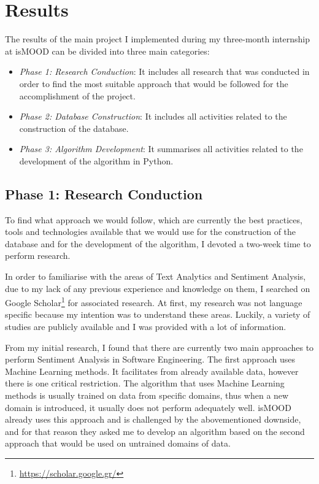 \section{Results}
\label{sec:results}

The results of the main project I implemented
during my three-month internship at isMOOD can be divided
into three main categories:

\begin{itemize}
  \item \emph{Phase 1: Research Conduction}: It includes all research that was conducted
  in order to find the most suitable approach
  that would be followed for the accomplishment of the project. 
  \item \emph{Phase 2: Database Construction}: It includes all activities related to the construction
  of the database.
  \item \emph{Phase 3: Algorithm Development}: It summarises all activities related to the development
  of the algorithm in Python.
\end{itemize}

\subsection{Phase 1: Research Conduction}
\label{subsec:research}

To find what approach we would follow,
which are currently the best practices, tools and technologies available
that we would use for the construction of the database
and for the development of the algorithm,
I devoted a two-week time to perform research.

In order to familiarise with the areas
of Text Analytics and Sentiment Analysis,
due to my lack of any previous experience and knowledge on them,
I searched on Google Scholar\footnote{\url {https://scholar.google.gr/}}
for associated research.
At first, my research was not language specific
because my intention was to understand these areas.
Luckily, a variety of studies are publicly available
and I was provided with a lot of information.

From my initial research, I found that 
there are currently two main approaches
to perform Sentiment Analysis in Software Engineering.
The first approach uses Machine Learning methods.
It facilitates from already available data,
however there is one critical restriction.
The algorithm that uses Machine Learning methods
is usually trained on data from specific domains,
thus when a new domain is introduced,
it usually does not perform adequately well.
isMOOD already uses this approach
and is challenged by the abovementioned downside,
and for that reason they asked me to develop
an algorithm based on the second approach
that would be used on untrained domains of data.

